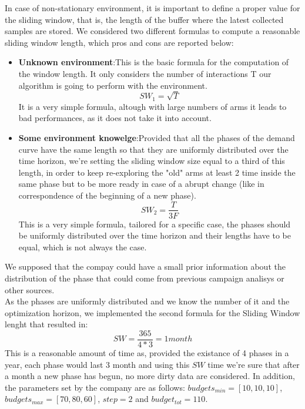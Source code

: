 In case of non-stationary environment, it is important to define a
proper value for the sliding window, that is, the length of the buffer where the latest
collected samples are stored. We considered two different formulas to compute a
reasonable sliding window length, which pros and cons are reported below:

\begin{itemize}
	\item \textbf{Unknown environment}:\@  This is the basic formula for the computation of the window length. It only considers the number of interactions T our algorithm is going to perform
	with the environment.
	$$SW_1 = \sqrt{T}$$
	It is a very simple formula, altough with large numbers of arms it leads to bad performances, as it does not take it into account.
	
	\item \textbf{Some environment knowelge}:\@  Provided that all the phases of the demand curve have the same length so that they are uniformly distributed over the time horizon, we’re setting the sliding window size equal to a third of this length, in 	order to keep re-exploring the "old" arms at least 2 time inside the same phase but to be more ready in case of a abrupt change (like in correspondence of the beginning
	of a new phase).
	$$SW_2 = \dfrac{T}{3F}$$
	This is a very simple formula, tailored for a specific case, the phases should be uniformly distributed over the time horizon
	and their lengths have to be equal, which is not always the case.	
\end{itemize} 

We supposed that the compay could have a small prior information about the distribution of the phase that could come from previous campaign analisys or other sources.
\\As the phases are uniformly distributed and we know the number of it and the optimization horizon, we implemented the second formula for the Sliding Window lenght that resulted in:
$$SW = \dfrac{365}{4*3} = 1 month$$
This is a reasonable amount of time as, provided the existance of 4 phases in a year, each phase would last 3 month and using this $SW$ time we're sure that after a month a new phase has begun, no more dirty data are considered.
In addition, the parameters set by the company are as follows:
$budgets_{min} = [10, 10, 10]$, $budgets_{max} = [70, 80, 60]$, $step = 2$ and $budget_{tot} = 110$.